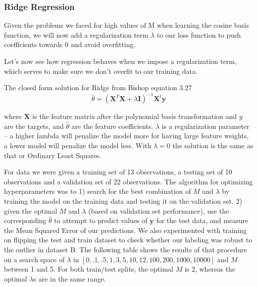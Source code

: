 \documentclass[10pt]{article}
\begin{document}
\subsubsection*{Ridge Regression}

Given the problems we faced for high values of M when learning the cosine basis function, we will now add a regularization term  $\lambda$ to our loss function to push coefficients towards 0 and avoid overfitting. 

Let's now see how regression behaves when we impose a regularization term, whicb serves to make sure we don't overfit to our training data. 

The closed form solution for Ridge from Bishop equation 3.27
\begin{equation}
\hat{\theta} = (\mathbf{X}^T\mathbf{X} + \lambda \mathbf{I})^{-1}\mathbf{X}^t\mathbf{y}
\end{equation}

\noindent where $\mathbf{X}$ is the feature matrix after the polynomial basis transformation and  $y$ are the targets, and $\hat{\theta}$ are the feature coefficients. $\lambda$ is a regularization parameter --  a higher lambda will penalize the model more for having large feature weights, a lower model will penalize the model less. With $\lambda =0$ the solution is the same as that or Ordinary Least Squares.

For data we were given a training set of 13 observations, a testing set of 10 observations and a validation set of 22 observations. The algorithm for optimizing hyperparameters was to 1) search for the best combination of $M$ and $\lambda$ by training the model on the training data and testing it on the validation set. 2) given the optimal  $M$ and $\lambda$  (based on validation set performance), use the corresponding $\hat{\theta}$ to attempt to predict values of $\mathbf{y}$ for the test data, and measure the Mean Squared Error of our predictions. We also experimented with training on flipping the test and train dataset to check whether our labeling was robust to the outlier in dataset B. The following table shows the results of that procedure on a search space of  $\lambda$ in $[0, .1, .5, 1, 3,5,10, 12, 100, 200, 1000, 10000]$ and $M$  between 1 and 5. For both train/test splits, the optimal $M$ is 2, whereas the optimal $\lambda$s are in the same range. 
\end{document}
